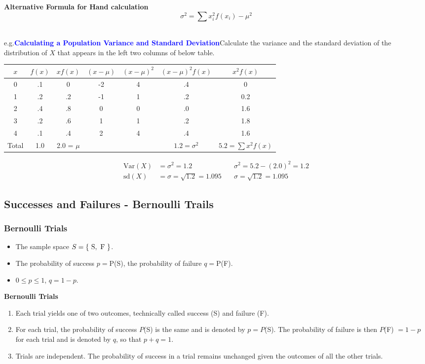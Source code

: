 \documentclass[12pt,openany]{book}
\theoremstyle{definition}
\newcommand{\eg}{\textnormal{e.g.}}
\newcommand{\Var}{\text{Var}}
\newcommand{\sd}{\text{sd}}
\begin{document}
	\begin{tcolorbox}[colback=white]
		\centering
		\textbf{Alternative Formula for Hand calculation} \[
		\sigma^2=\sum x_i^2f(x_i) - \mu^2
		\]
	\end{tcolorbox}\ \\
	\eg\textcolor{blue}{\bf Calculating a Population Variance and Standard Deviation}\quad Calculate the variance and the standard deviation of the distribution of $X$ that appears in the left two columns of below table.
	\begin{center}\begin{tabular}{c|c||cccc||c}
			\toprule[1.2pt]
			$x$ & $f(x)$ & $xf(x)$ & $(x-\mu)$ & $(x-\mu)^2$ & $(x-\mu)^2f(x)$ & $x^2f(x)$\\
			\hline
			0&.1& 0 & -2&4&.4&0\\
			1&.2& .2& -1&1&.2&0.2\\
			2&.4& .8& 0&0&.0&1.6\\
			3&.2& .6& 1&1&.2&1.8\\
			4&.1& .4& 2&4&.4&1.6\\
			\hline
			Total&1.0&2.0 = $\mu$&&&$1.2=\sigma^2$&$5.2=\sum x^2f(x)$\\
		\end{tabular}
	\end{center}\begin{align*}
		\Var(X)&=\sigma^2=1.2\quad& \sigma^2=5.2-(2.0)^2=1.2 \\
		\sd(X)&=\sigma=\sqrt{1.2}=1.095\quad& \sigma=\sqrt{1.2}=1.095
	\end{align*}
	
	\subsection{Successes and Failures - Bernoulli Trails}
	
	\subsubsection{Bernoulli Trials}
	\begin{itemize}
		\item The sample space $S = \set{\ \text{S},\ \text{F}\ }$.
		\item The probability of success $p=$P(S), the probability of failure $q=$P(F).
		\item $0\leq p\leq 1$, $q=1-p$.
	\end{itemize}
	\begin{tcolorbox}[colback=white]
		\centering
		\textbf{Bernoulli Trials} \begin{enumerate}
			\item Each trial yields one of two outcomes, technically called success (S) and failure (F).
			\item For each trial, the probability of success $P$(S) is the same and is denoted by $p = P$(S). The probability of failure is then $P$(F) $= 1-p$ for each trial and is denoted by $q$, so that $p+q=1$.
			\item Trials are independent. The probability of success in a trial remains unchanged given the outcomes of all the other trials.	
		\end{enumerate}
	\end{tcolorbox}
	
\end{document}
